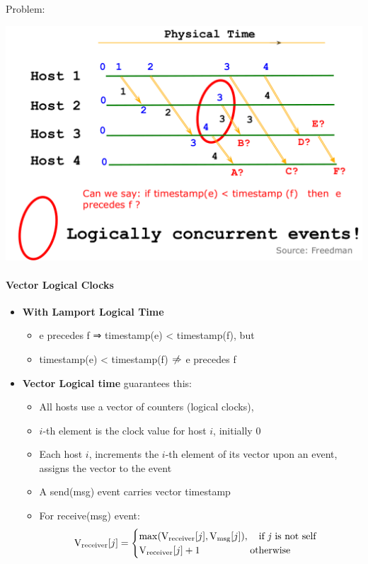 Problem:

\includegraphics[scale=0.15]{graphics/lamport-problem.png}


\paragraph{Vector Logical Clocks}

\begin{itemize}
\item \textbf{With Lamport Logical Time}
  \begin{itemize}
  \item e precedes f ⇒ timestamp(e) < timestamp(f), but
  \item timestamp(e) < timestamp(f) $\centernot\Rightarrow$
    e precedes f
  \end{itemize}
\end{itemize}

\begin{itemize}
\item \textbf{Vector Logical time} guarantees this:
  \begin{itemize}
  \item All hosts use a vector of counters (logical clocks),
  \item $i$-th element is the clock value for host $i$, initially 0
  \item Each host $i$, increments the $i$-th element of its vector
    upon an event, assigns the vector to the event
  \item A send(msg) event carries vector timestamp
  \item For receive(msg) event:
\begin{align*}
    \text{V}_{\text{receiver}}[j] = \begin{cases}
      \max (\text{V}_{\text{receiver}}[j], \text{V}_{\text{msg}}[j]),
      \quad \text{if \textit{j} is not self} \\
      \text{V}_{\text{receiver}}[j] + 1
      \hspace{1.8cm} \text{otherwise}
      \end{cases}
\end{align*}
  \end{itemize}
\end{itemize}

